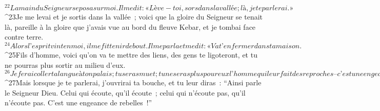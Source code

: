   
  
${}^{22}La main du Seigneur se posa sur moi. Il me dit : « Lève-toi, sors dans la vallée ; là, je te parlerai. » 
${}^{23}Je me levai et je sortis dans la vallée ; voici que la gloire du Seigneur se tenait là, pareille à la gloire que j’avais vue au bord du fleuve Kebar, et je tombai face contre terre. 
${}^{24}Alors l’esprit vint en moi, il me fit tenir debout. Il me parla et me dit : « Va t’enfermer dans ta maison. 
${}^{25}Fils d’homme, voici qu’on va te mettre des liens, des gens te ligoteront, et tu ne pourras plus sortir au milieu d’eux. 
${}^{26}Je ferai coller ta langue à ton palais ; tu seras muet ; tu ne seras plus pour eux l’homme qui leur fait des reproches – c’est une engeance de rebelles ! 
${}^{27}Mais lorsque je te parlerai, j’ouvrirai ta bouche, et tu leur diras : “Ainsi parle le Seigneur Dieu. Celui qui écoute, qu’il écoute ; celui qui n’écoute pas, qu’il n’écoute pas. C’est une engeance de rebelles !”
      
